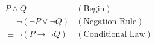 

  

\begin{align*}
  &P \land Q &(\textrm{Begin})\\
  &\equiv \neg(\neg P \lor \neg Q) &(\textrm{Negation Rule})\\
  &\equiv \neg(P \rightarrow \neg Q) &(\textrm{Conditional Law})
\end{align*}
